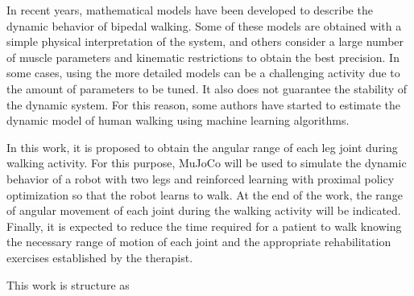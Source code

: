 In recent years, mathematical models have been developed to describe the dynamic behavior of bipedal walking. Some of these models are obtained with a simple physical interpretation of the system, and others consider a large number of muscle parameters and kinematic restrictions to obtain the best precision. In some cases, using the more detailed models can be a challenging activity due to the amount of parameters to be tuned. It also does not guarantee the stability of the dynamic system. For this reason, some authors have started to estimate the dynamic model of human walking using machine learning algorithms.


In this work, it is proposed to obtain the angular range of each leg joint during walking activity. For this purpose, MuJoCo will be used to simulate the dynamic behavior of a robot with two legs and reinforced learning with proximal policy optimization so that the robot learns to walk. At the end of the work, the range of angular movement of each joint during the walking activity will be indicated. Finally, it is expected to reduce the time required for a patient to walk knowing the necessary range of motion of each joint and the appropriate rehabilitation exercises established by the therapist.

This work is structure as 

